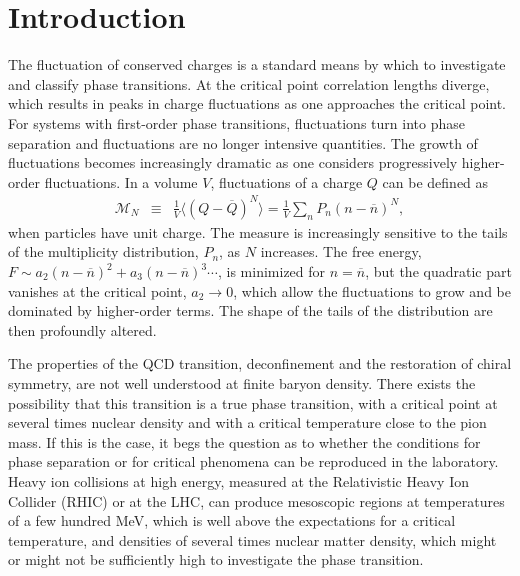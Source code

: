 
\section{Introduction}\label{sec:intro}

The fluctuation of conserved charges is a standard means by which to investigate and classify phase transitions. At the critical point correlation lengths diverge, which results in peaks in charge fluctuations as one approaches the critical point. For systems with first-order phase transitions, fluctuations turn into phase separation and fluctuations are no longer intensive quantities. The growth of fluctuations becomes increasingly dramatic as one considers progressively higher-order fluctuations. In a volume $V$, fluctuations of a charge $Q$ can be defined as
\begin{eqnarray}\label{eq:kappadef}
\mathcal{M}_N&\equiv&\frac{1}{V}\langle(Q-\overline{Q})^N\rangle=\frac{1}{V}\sum_n P_n(n-\overline{n})^N,
\end{eqnarray}
when particles have unit charge. The measure is increasingly sensitive to the tails of the multiplicity distribution, $P_n$, as $N$ increases. The free energy, $F\sim a_2(n-\overline{n})^2 + a_3(n-\overline{n})^3\cdots$, is minimized for $n=\overline{n}$, but the quadratic part vanishes at the critical point, $a_2\rightarrow 0$, which allow the fluctuations to grow and be dominated by higher-order terms. The shape of the tails of the distribution are then profoundly altered. 

The properties of the QCD  transition, deconfinement and the restoration of chiral symmetry, are not well understood at finite baryon density. There exists the possibility that this transition is a true phase transition, with a critical point at several times nuclear density and with a critical temperature close to the pion mass. If this is the case, it begs the question as to whether the conditions for phase separation or for critical phenomena can be reproduced in the laboratory. Heavy ion collisions at high energy, measured at the Relativistic Heavy Ion Collider (RHIC) or at the LHC, can produce mesoscopic regions at temperatures of a few hundred MeV, which is well above the expectations for a critical temperature, and densities of several times nuclear matter density, which might or might not be sufficiently high to investigate the phase transition. 

